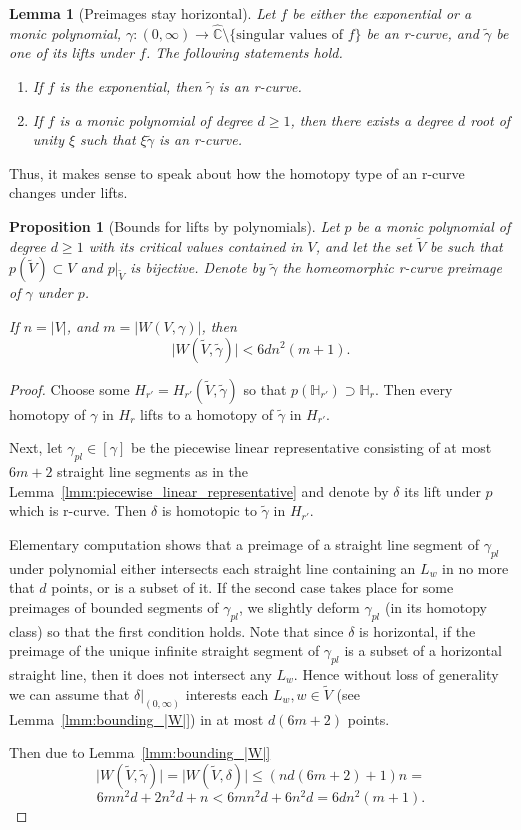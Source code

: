 \documentclass[10pt,reqno,a4paper]{amsart}
\numberwithin{figure}{section}
\numberwithin{equation}{section}
\newtheorem{lmm}[thm]{Lemma}
\newtheorem{prp}[thm]{Proposition}
\newcommand{\abs}[1]{\lvert #1 \rvert}
\begin{document}
\begin{lmm}[Preimages stay horizontal]
	Let $f$ be either the exponential or a monic polynomial, $\gamma:(0,\infty)\to\hat{\mathbb{C}}\setminus\{\text{singular values of }f\}$ be an r-curve, and $\tilde{\gamma}$ be one of its lifts under $f$. The following statements hold.
	\begin{enumerate}
		\item If $f$ is the exponential, then $\tilde{\gamma}$ is an r-curve.
		\item If $f$ is a monic polynomial of degree $d\geq 1$, then there exists a degree $d$ root of unity $\xi$ such that $\xi \tilde{\gamma}$ is an r-curve.
	\end{enumerate}
\end{lmm}

Thus, it makes sense to speak about how the homotopy type of an r-curve changes under lifts.

\begin{prp}[Bounds for lifts by polynomials]
	\label{prp:lift_through_polynomial}
	Let $p$ be a monic polynomial of degree $d\geq 1$ with its critical values contained in $V$, and let the set $\tilde{V}$ be such that $p(\tilde{V})\subset V$ and $p|_{\tilde{V}}$ is bijective. Denote by $\tilde{\gamma}$ the homeomorphic r-curve preimage of $\gamma$ under $p$.
	
	If $n=\abs{V}$, and $m=\abs{W(V,\gamma)}$, then $$\abs{W(\tilde{V},\tilde{\gamma})}<6dn^2(m+1).$$		
\end{prp}
\begin{proof}
	
	Choose some $H_{r'}=H_{r'}(\tilde{V},\tilde{\gamma})$ so that $p(\mathbb{H}_{r'})\supset \mathbb{H}_r$. Then every homotopy of $\gamma$ in $H_r$ lifts to a homotopy of $\tilde{\gamma}$ in $H_{r'}$.	
	
	Next, let $\gamma_{pl}\in [\gamma]$ be the piecewise linear representative consisting of at most $6m+2$ straight line segments as in the Lemma~\ref{lmm:piecewise_linear_representative} and denote by $\delta$ its lift under $p$ which is r-curve. Then $\delta$ is homotopic to $\tilde{\gamma}$ in $H_{r'}$.
	
	Elementary computation shows that a preimage of a straight line segment of $\gamma_{pl}$ under polynomial either intersects each straight line containing an $L_w$ in no more that $d$ points, or is a subset of it. If the second case takes place for some preimages of bounded segments of $\gamma_{pl}$, we slightly deform $\gamma_{pl}$ (in its homotopy class) so that the first condition holds. Note that since $\delta$ is horizontal, if the preimage of the unique infinite straight segment of $\gamma_{pl}$ is a subset of a horizontal straight line, then it does not intersect any $L_w$. Hence without loss of generality we can assume that $\delta|_{(0,\infty)}$ interests each $L_w, w\in\tilde{V}$ (see Lemma~\ref{lmm:bounding_|W|}) in at most $d(6m+2)$ points.
	
	Then due to Lemma~\ref{lmm:bounding_|W|}
	$$\abs{W(\tilde{V},\tilde{\gamma})}=\abs{W(\tilde{V},\delta)}\leq(nd(6m+2)+1)n=$$
	$$6mn^2d+2n^2d+n<6mn^2d+6n^2d=6dn^2(m+1).$$
\end{proof}
\end{document}
